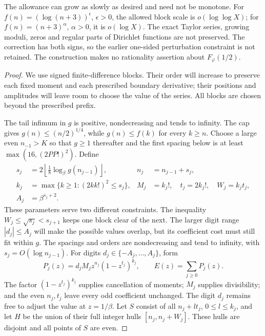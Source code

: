 \documentclass[11pt]{article}
\theoremstyle{plain}
\theoremstyle{definition}
\theoremstyle{remark}
\begin{document}
The allowance can grow as slowly as desired and need not be monotone.
For $f(n)=(\log(n+3))^\epsilon$, $\epsilon>0$, the allowed block scale
is $o(\log\log X)$; for $f(n)=(n+3)^\alpha$, $\alpha>0$, it is
$o(\log X)$. The exact Taylor series, growing moduli, zeros and regular
parts of Dirichlet functions are not preserved. The correction has both signs, so the earlier one-sided perturbation
constraint is not retained. The construction makes no rationality
assertion about $F_\varphi(1/2)$.

\begin{proof}
We use signed finite-difference blocks. Their order will increase to
preserve each fixed moment and each prescribed boundary derivative;
their positions and amplitudes will leave room to choose the value of
the series. All blocks are chosen beyond the prescribed prefix.

The tail infimum in $g$ is positive, nondecreasing and tends to infinity.
The cap gives $g(n)\le(n/2)^{1/4}$, while $g(n)\le f(k)$ for every
$k\ge n$. Choose a large even $n_{-1}>K$ so that $g\ge1$ thereafter
and the first spacing below is at least $\max(16,(2PP!)^2)$. Define
\[
 \begin{aligned}
 s_j&=2\left\lfloor\tfrac18\log_\beta g(n_{j-1})\right\rfloor,
 &n_j&=n_{j-1}+s_j,\\
 k_j&=\max\{k\ge1:(2kk!)^2\le s_j\},
 &M_j&=k_j!,\quad t_j=2k_j!,\quad W_j=k_jt_j,\\
 A_j&=\beta^{s_j+2}.
 \end{aligned}
\]
These parameters serve two different constraints. The inequality
$W_j\le\sqrt{s_j}<s_{j+1}$ keeps one block clear of the next.
The larger digit range $|d_j|\le A_j$ will make the possible values
overlap, but its coefficient cost must still fit within $g$.
The spacings and orders are nondecreasing and tend to infinity,
with $s_j=O(\log n_{j-1})$. For digits
$d_j\in\{-A_j,\ldots,A_j\}$, form
\[
 P_j(z)=d_jM_jz^{n_j}(1-z^{t_j})^{k_j},\qquad E(z)=\sum_{j\ge0}P_j(z).
\]
The factor $(1-z^{t_j})^{k_j}$ supplies cancellation of moments;
$M_j$ supplies divisibility; and the even $n_j,t_j$ leave every odd
coefficient unchanged. The digit $d_j$ remains free to adjust the value
at $z=1/\beta$.
Let $S$ consist of all $n_j+lt_j$, $0\le l\le k_j$, and let $H$ be
the union of their full integer hulls $[n_j,n_j+W_j]$. These hulls are
disjoint and all points of $S$ are even.


\end{proof}
\end{document}
